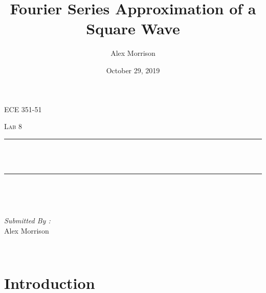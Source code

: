 \documentclass[12pt]{report}
\title{Fourier Series Approximation of a Square Wave}
\author{ Alex Morrison}
\date{October 29, 2019}
\makeatletter
\let\thetitle\@title
\makeatother
\begin{document}

\begin{titlepage}
	\centering
    \vspace*{0.5 cm}
\begin{center}    \textsc{\Large ECE 351-51}\\[2.0 cm]	\end{center}%
	\textsc{\Large  Lab 8}\\[0.5 cm]				%
	\rule{\linewidth}{0.2 mm} \\[0.4 cm]
	{ \huge \bfseries \thetitle}\\
	\rule{\linewidth}{0.2 mm} \\[1.5 cm]
	
	\begin{minipage}{0.4\textwidth}
		\begin{flushleft} \large
			\end{flushleft}
			\end{minipage}~
			\begin{minipage}{0.4\textwidth}
            
			\begin{flushright} \large
			\emph{Submitted By :} \\
			Alex Morrison  
		\end{flushright}
           
	\end{minipage}\\[2 cm]
	

    
    
    
    
	
\end{titlepage}


\tableofcontents
\pagebreak

\renewcommand{\thesection}{\arabic{section}}
\section{Introduction}
 
\end{document}
